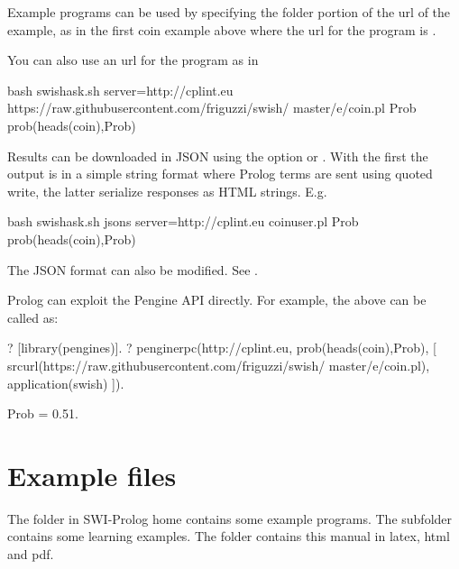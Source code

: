 \documentclass[letterpaper,10pt,english]{sphinxmanual}
\begin{document}
Example programs can be used by specifying the folder portion of the url of the example, as in the first coin example above where the url for the program is .

You can also use an url for the program as in

\begin{sphinxVerbatim}[commandchars=\\\{\}]
\PYGZdl{} bash swish\PYGZhy{}ask.sh \PYGZhy{}\PYGZhy{}server=http://cplint.eu \PYGZbs{}
https://raw.githubusercontent.com/friguzzi/swish/\PYGZbs{}
master/e/coin.pl Prob \PYGZdq{}prob(heads(coin),Prob)\PYGZdq{}
\end{sphinxVerbatim}

Results can be downloaded in JSON using the option  or . With the first the output is in a simple string format where Prolog terms are sent using quoted write, the latter serialize responses as HTML strings.
E.g.

\begin{sphinxVerbatim}[commandchars=\\\{\}]
\PYGZdl{} bash swish\PYGZhy{}ask.sh \PYGZhy{}\PYGZhy{}json\PYGZhy{}s \PYGZhy{}\PYGZhy{}server=http://cplint.eu \PYGZbs{}
        coin\PYGZus{}user.pl Prob \PYGZdq{}prob(heads(coin),Prob)\PYGZdq{}
\end{sphinxVerbatim}

The JSON format can also be modified.
See .

Prolog can exploit the Pengine API directly. For example, the above can be called as:

\begin{sphinxVerbatim}[commandchars=\\\{\}]
?\PYGZhy{} [library(pengines)].
?\PYGZhy{} pengine\PYGZus{}rpc(\PYGZsq{}http://cplint.eu\PYGZsq{},
        prob(heads(coin),Prob),
        [ src\PYGZus{}url(\PYGZsq{}https://raw.githubusercontent.com/friguzzi/swish/\PYGZbs{}
                master/e/coin.pl\PYGZsq{}),
                application(swish)
]).

Prob = 0.51.
\end{sphinxVerbatim}


\chapter{Example files}
\label{\detokenize{index:example-files}}
The  folder in SWI-Prolog home contains some example programs.
The subfolder  contains some learning examples.
The  folder contains this manual in latex, html and pdf.
\end{document}
